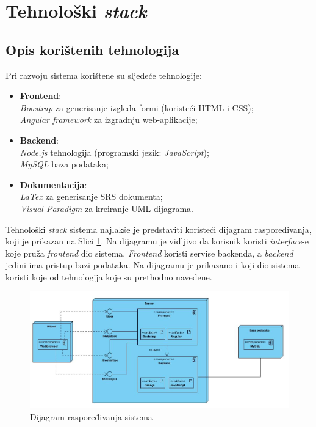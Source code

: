 \documentclass[12pt,a4paper]{article}
\begin{document}
\newpage

\section{Tehnološki \textit{stack}}

\subsection{Opis korištenih tehnologija}

Pri razvoju sistema korištene su sljedeće tehnologije:

\begin{itemize}
\item \textbf{Frontend}: \\
\textit{Boostrap} za generisanje izgleda formi (koristeći HTML i CSS); \\
\textit{Angular framework} za izgradnju web-aplikacije;
\item \textbf{Backend}: \\
\textit{Node.js} tehnologija (programski jezik: \textit{JavaScript}); \\
\textit{MySQL} baza podataka;
\item \textbf{Dokumentacija}: \\
\textit{LaTex} za generisanje SRS dokumenta; \\
\textit{Visual Paradigm} za kreiranje UML dijagrama.
\end{itemize}

Tehnološki \textit{stack} sistema najlakše je predstaviti koristeći dijagram raspoređivanja, koji je prikazan na Slici \ref{deployment}. Na dijagramu je vidljivo da korisnik koristi \textit{interface}-e koje pruža \textit{frontend} dio sistema. \textit{Frontend} koristi servise backenda, a \textit{backend} jedini ima pristup bazi podataka. Na dijagramu je prikazano i koji dio sistema koristi koje od tehnologija koje su prethodno navedene.

\begin{figure}[H]
\center
\includegraphics[scale=0.55]{../res/deployment.JPG}
\caption{Dijagram raspoređivanja sistema}
\label{deployment}
\end{figure}
\end{document}

